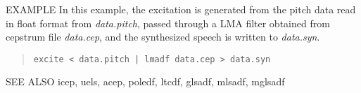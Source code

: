 \begin{qsection}{EXAMPLE}
In this example, the excitation is generated from
the pitch data read in float format from {\em data.pitch},
passed through a LMA filter obtained from cepstrum file
{\em data.cep}, and the synthesized speech is written to
{\em data.syn}.
\begin{quote}
 \verb!excite < data.pitch | lmadf data.cep > data.syn!
\end{quote} 
\end{qsection}

\begin{qsection}{SEE ALSO}
 icep, uels, acep, poledf, ltcdf, glsadf, mlsadf, mglsadf
\end{qsection}
